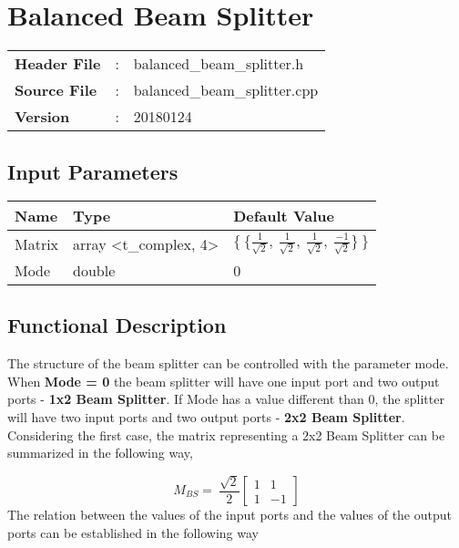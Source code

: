 \clearpage

\section{Balanced Beam Splitter}

\begin{tcolorbox}	
\begin{tabular}{p{2.75cm} p{0.2cm} p{10.5cm}} 	
\textbf{Header File}   &:& balanced\_beam\_splitter.h \\
\textbf{Source File}   &:& balanced\_beam\_splitter.cpp \\
\textbf{Version}       &:& 20180124
\end{tabular}
\end{tcolorbox}

\subsection*{Input Parameters}

\begin{table}[H]
\centering
\begin{tabular}{|l|l|l|}
\hline
Name           & Type    & Default Value     \\ \hline
Matrix         & array <t\_complex, 4> & $\lbrace~\lbrace \frac{1}{\sqrt{2}},~\frac{1}{\sqrt{2}},~\frac{1}{\sqrt{2}},~\frac{-1}{\sqrt{2}} \rbrace~\rbrace$                             \\ \hline
Mode           & double  & 0                 \\ \hline
\end{tabular}
\end{table}

\subsection*{Functional Description}
The structure of the beam splitter can be controlled with the parameter mode.\\
When \textbf{Mode = 0} the beam splitter will have one input port and two output ports - \textbf{1x2 Beam Splitter}. If Mode has a value different than 0, the splitter will have two input ports and two output ports - \textbf{2x2 Beam Splitter}.\\
Considering the first case, the matrix representing a 2x2 Beam Splitter can be summarized in the following way,

\begin{equation}
M_{BS}=~\frac{\sqrt{2}}{2}\begin{bmatrix}
              					1  & 1 \\
            					1 & -1
            			  \end{bmatrix}
\end{equation}
The relation between the values of the input ports and the values of the output ports can be established in the following way

